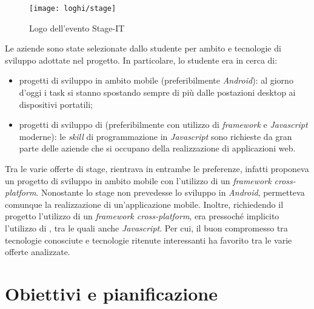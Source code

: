 \begin{figure}[!h] 
    \centering 
    \texttt{[image: loghi/stage]} 
    \caption{Logo dell'evento Stage-IT}
\end{figure}

Le aziende sono state selezionate dallo studente per ambito e tecnologie di sviluppo adottate nel progetto. In particolare, lo studente era in cerca di:
\begin{itemize}
	\item progetti di sviluppo in ambito mobile (preferibilmente \textit{Android}): al giorno d'oggi i task si stanno spostando sempre di più dalle postazioni desktop ai dispositivi portatili;
	\item progetti di sviluppo di  (preferibilmente con utilizzo di \textit{framework} e  \textit{Javascript} moderne): le \textit{skill} di programmazione in \textit{Javascript} sono richieste da gran parte delle aziende che si occupano della realizzazione di applicazioni web.
\end{itemize}
Tra le varie offerte di stage, \visione{} rientrava in entrambe le preferenze, infatti proponeva un progetto di sviluppo in ambito mobile con l'utilizzo di un \textit{framework cross-platform}. Nonostante lo stage non prevedesse lo sviluppo in  \textit{Android}, permetteva comunque la realizzazione di un'applicazione mobile. Inoltre, richiedendo il progetto l'utilizzo di un \textit{framework cross-platform}, era pressoché implicito l'utilizzo di , tra le quali anche \textit{Javascript}. Per cui, il buon compromesso tra tecnologie conosciute e tecnologie ritenute interessanti ha favorito \visione{} tra le varie offerte analizzate.

\newpage

\section{Obiettivi e pianificazione}

